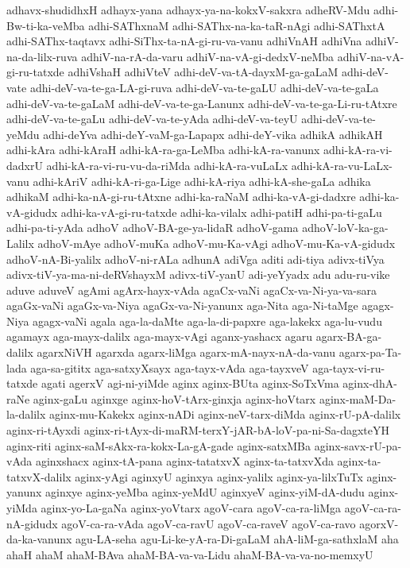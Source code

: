 {adhavx-shudidhxH
adhayx-yana
adhayx-ya-na-kokxV-sakxra
adheRV-Mdu
adhi-Bw-ti-ka-veMba
adhi-SAThxnaM
adhi-SAThx-na-ka-taR-nAgi
adhi-SAThxtA
adhi-SAThx-taqtavx
adhi-SiThx-ta-nA-gi-ru-va-vanu
adhiVnAH
adhiVna
adhiV-na-da-lilx-ruva
adhiV-na-rA-da-varu
adhiV-na-vA-gi-dedxV-neMba
adhiV-na-vA-gi-ru-tatxde
adhiVshaH
adhiVteV
adhi-deV-va-tA-dayxM-ga-gaLaM
adhi-deV-vate
adhi-deV-va-te-ga-LA-gi-ruva
adhi-deV-va-te-gaLU
adhi-deV-va-te-gaLa
adhi-deV-va-te-gaLaM
adhi-deV-va-te-ga-Lanunx
adhi-deV-va-te-ga-Li-ru-tAtxre
adhi-deV-va-te-gaLu
adhi-deV-va-te-yAda
adhi-deV-va-teyU
adhi-deV-va-te-yeMdu
adhi-deYva
adhi-deY-vaM-ga-Lapapx
adhi-deY-vika
adhikA
adhikAH
adhi-kAra
adhi-kAraH
adhi-kA-ra-ga-LeMba
adhi-kA-ra-vanunx
adhi-kA-ra-vi-dadxrU
adhi-kA-ra-vi-ru-vu-da-riMda
adhi-kA-ra-vuLaLx
adhi-kA-ra-vu-LaLx-vanu
adhi-kAriV
adhi-kA-ri-ga-Lige
adhi-kA-riya
adhi-kA-she-gaLa
adhika
adhikaM
adhi-ka-nA-gi-ru-tAtxne
adhi-ka-raNaM
adhi-ka-vA-gi-dadxre
adhi-ka-vA-gidudx
adhi-ka-vA-gi-ru-tatxde
adhi-ka-vilalx
adhi-patiH
adhi-pa-ti-gaLu
adhi-pa-ti-yAda
adhoV
adhoV-BA-ge-ya-lidaR
adhoV-gama
adhoV-loV-ka-ga-Lalilx
adhoV-mAye
adhoV-muKa
adhoV-mu-Ka-vAgi
adhoV-mu-Ka-vA-gidudx
adhoV-nA-Bi-yalilx
adhoV-ni-rALa
adhunA
adiVga
aditi
adi-tiya
adivx-tiVya
adivx-tiV-ya-ma-ni-deRVshayxM
adivx-tiV-yanU
adi-yeYyadx
adu
adu-ru-vike
aduve
aduveV
agAmi
agArx-hayx-vAda
agaCx-vaNi
agaCx-va-Ni-ya-va-sara
agaGx-vaNi
agaGx-va-Niya
agaGx-va-Ni-yanunx
aga-Nita
aga-Ni-taMge
agagx-Niya
agagx-vaNi
agala
aga-la-daMte
aga-la-di-papxre
aga-lakekx
aga-lu-vudu
agamayx
aga-mayx-dalilx
aga-mayx-vAgi
aganx-yashacx
agaru
agarx-BA-ga-dalilx
agarxNiVH
agarxda
agarx-liMga
agarx-mA-nayx-nA-da-vanu
agarx-pa-Ta-lada
aga-sa-gititx
aga-satxyXsayx
aga-tayx-vAda
aga-tayxveV
aga-tayx-vi-ru-tatxde
agati
agerxV
agi-ni-yiMde
aginx
aginx-BUta
aginx-SoTxVma
aginx-dhA-raNe
aginx-gaLu
aginxge
aginx-hoV-tArx-ginxja
aginx-hoVtarx
aginx-maM-Da-la-dalilx
aginx-mu-Kakekx
aginx-nADi
aginx-neV-tarx-diMda
aginx-rU-pA-dalilx
aginx-ri-tAyxdi
aginx-ri-tAyx-di-maRM-terxY-jAR-bA-loV-pa-ni-Sa-dagxteYH
aginx-riti
aginx-saM-sAkx-ra-kokx-La-gA-gade
aginx-satxMBa
aginx-savx-rU-pa-vAda
aginxshacx
aginx-tA-pana
aginx-tatatxvX
aginx-ta-tatxvXda
aginx-ta-tatxvX-dalilx
aginx-yAgi
aginxyU
aginxya
aginx-yalilx
aginx-ya-lilxTuTx
aginx-yanunx
aginxye
aginx-yeMba
aginx-yeMdU
aginxyeV
aginx-yiM-dA-dudu
aginx-yiMda
aginx-yo-La-gaNa
aginx-yoVtarx
agoV-cara
agoV-ca-ra-liMga
agoV-ca-ra-nA-gidudx
agoV-ca-ra-vAda
agoV-ca-ravU
agoV-ca-raveV
agoV-ca-ravo
agorxV-da-ka-vanunx
agu-LA-seha
agu-Li-ke-yA-ra-Di-gaLaM
ahA-liM-ga-sathxlaM
aha
ahaH
ahaM
ahaM-BAva
ahaM-BA-va-va-Lidu
ahaM-BA-va-va-no-memxyU
}
